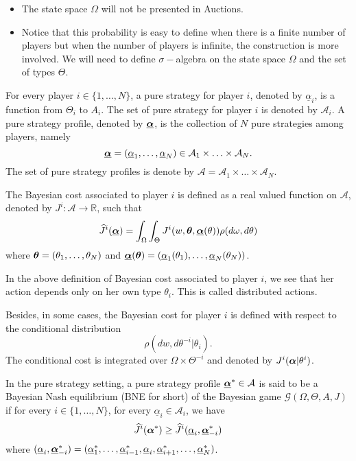 \begin{remark}
	\begin{itemize} 
		\item The state space $\Omega$ will not be presented in Auctions.
		\item Notice that this probability is easy to define when there is a finite number of players but when the number of players is infinite, the construction is more involved. We will need to define $\sigma-$algebra on the state space $\Omega$ and the set of types $\Theta$.
	\end{itemize}
\end{remark}

\begin{definition}
	For every player $i \in \{1,\ldots,N\}$, a pure strategy for player $i$, denoted by $\underline{\alpha}_i$, is a function from $\Theta_i$ to $A_i$. The set of pure strategy for player $i$ is denoted by $\mathcal{A}_i$. 	A pure strategy profile, denoted by $\underline{\boldsymbol{\alpha}}$, is the collection of $N$ pure strategies among players, namely 
	$$
	\underline{\boldsymbol{\alpha}} = (\underline{\alpha}_1, \ldots, \underline{\alpha}_N) \in \mathcal{A}_1 \times \ldots \times \mathcal{A}_N.
	$$
	The set of pure strategy profiles is denote by $\mathcal{A} = \mathcal{A}_1 \times \ldots \times \mathcal{A}_N$.
	
	The Bayesian cost associated to player $i$ is defined as a real valued function on $\mathcal{A}$, denoted by $J^i: \mathcal{A} \to \mathbb{R}$, such that
	$$
	\widehat{J}^i(\underline{\boldsymbol{\alpha}}) = \int_{\Omega} \int_\Theta J^i(w, \boldsymbol{\theta}, \underline{\boldsymbol{\alpha}}(\theta) ) \rho(d\omega, d\theta)
	$$
	where $\boldsymbol{\theta} = (\theta_1, \ldots, \theta_N)$ and $\underline{\boldsymbol{\alpha}}(\boldsymbol{\theta}) = (\underline{\alpha}_1(\theta_1), \ldots, \underline{\alpha}_N(\theta_N) )$.	
\end{definition}


\begin{remark}
	In the above definition of Bayesian cost associated to player $i$, we see that her action depends only on her own type $\theta_i$. This is called distributed actions.
	
	Besides, in some cases, the Bayesian cost for player $i$ is defined with respect to the conditional distribution
	$$
	\rho(dw, d\theta^{-i} | \theta_i).
	$$
	The conditional cost is integrated over $\Omega \times \Theta^{-i}$ and denoted by $J^i(\boldsymbol{\alpha} | \theta^i)$.
\end{remark}


\begin{definition}
	In the pure strategy setting, a pure strategy profile $\underline{\boldsymbol{\alpha}}^* \in \mathcal{A}$ is said to be a Bayesian Nash equilibrium (BNE for short) of the Bayesian game $\mathcal{G}(\Omega ,\Theta, A, J)$ if for every $i \in \{1,\ldots, N\}$, for every $\underline{\alpha}_i \in \mathcal{A}_i$, we have
	$$
	\widehat{J}^i(\boldsymbol{\alpha}^*) \geq \widehat{J}^i( \underline{\alpha}_i, \underline{\boldsymbol{\alpha}}^*_{-i} ) 
	$$
	where $(\underline{\alpha}_i, \underline{\boldsymbol{\alpha}}_{-i}^*) = (\underline{\alpha}_1^*, \ldots, \underline{\alpha}_{i-1}^*, \underline{\alpha}_i, \underline{\alpha}_{i+1}^*, \ldots, \underline{\alpha}_N^*)$.
\end{definition}


